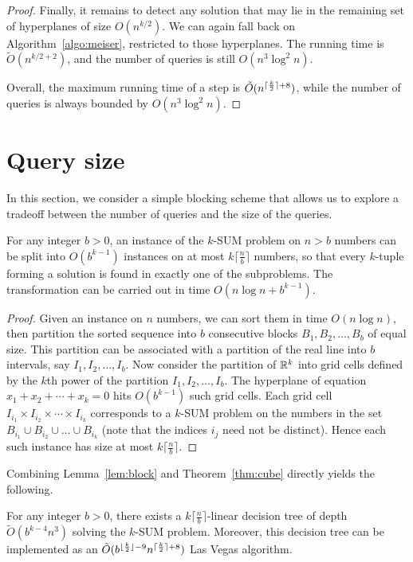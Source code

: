 \begin{proof}
Finally, it remains to detect any solution that may lie in the remaining
set of hyperplanes of size $O(n^{k/2})$. We can again fall back
on Algorithm~\ref{algo:meiser}, restricted to those hyperplanes. The running
time is $\tilde{O}(n^{k/2 + 2})$, and the number of queries is still
$O(n^3 \log^2 n)$.

Overall, the maximum running time of a step is $\tilde{O}(n^{\lceil\frac{k}{2}\rceil + 8})$,
while the number of queries is always bounded by $O(n^3\log^2 n)$.

\end{proof}

\section{Query size}
\label{sec:query-size}

In this section, we consider a simple blocking scheme that allows us to explore
a tradeoff between the number of queries and the size of the queries.

\begin{lemma}
\label{lem:block}
For any integer $b>0$, an instance of the \(k\)-SUM problem on $n>b$ numbers can be split into
$O(b^{k-1})$ instances on at most $k\lceil \frac{n}{b}\rceil$ numbers, so that every $k$-tuple
forming a solution is found in exactly one of the subproblems.
The transformation can be carried out in time $O(n\log n + b^{k-1})$.
\end{lemma}
\begin{proof}
Given an instance on $n$ numbers, we can sort them in time $O(n\log n)$, then partition
the sorted sequence into \(b\) consecutive blocks \(B_1, B_2,\ldots ,B_b\) of equal size.
This partition can be associated with a partition of the real line
into $b$ intervals, say $I_1, I_2,\ldots ,I_b$. Now consider the partition of $\mathbb{R}^k$
into grid cells defined by the $k$th power of the partition $I_1, I_2,\ldots ,I_b$. The
hyperplane of equation $x_1 + x_2 +\cdots +x_k = 0$ hits $O(b^{k-1})$ such grid cells.
Each grid cell $I_{i_1}\times I_{i_2}\times \cdots \times I_{i_k}$ corresponds to a
\(k\)-SUM problem on the numbers in the set $B_{i_1}\cup B_{i_2}\cup \ldots \cup B_{i_k}$ (note that
the indices $i_j$ need not be distinct). Hence each such instance has size at most $k\lceil \frac{n}{b}\rceil$.
\end{proof}

Combining Lemma~\ref{lem:block} and Theorem~\ref{thm:cube} directly yields the following.
\begin{theorem}\label{thm:query-size}
For any integer $b>0$, there exists a $k\lceil \frac{n}{b}\rceil$-linear
decision tree of depth \(\tilde{O}(b^{k-4} n^3)\) solving the \(k\)-SUM
problem.
Moreover, this decision tree can be implemented as an
$\tilde{O}(b^{\lfloor\frac{k}{2}\rfloor-9}n^{\lceil\frac{k}{2}\rceil+8})$
Las Vegas algorithm.
\end{theorem}


